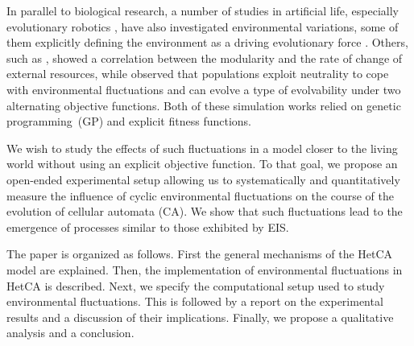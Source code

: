 In parallel to biological research, a number of studies in artificial life, especially evolutionary robotics \citep{floreano2000evolutionary}, have also investigated environmental variations, some of them explicitly defining the environment as a driving evolutionary force \citep{bredeche2012environmentdrivenopenende}.
Others, such as \citet{lipson2002origin}, showed a correlation between the modularity and the rate of change of external resources, while \citet{yu2007program} observed that populations exploit neutrality to cope with environmental fluctuations and can evolve a type of evolvability under two alternating objective functions. Both of these simulation works relied on genetic programming~(GP) and explicit fitness functions.

We wish to study the effects of such fluctuations in a model closer to the living world without using an explicit objective function. To that goal, we propose an open-ended experimental setup allowing us to systematically and quantitatively measure the influence of cyclic environmental fluctuations on the course of the evolution of cellular automata (CA). We show that such fluctuations lead to the emergence of processes similar to those exhibited by EIS.

The paper is organized as follows. First the general mechanisms of the HetCA model are explained. Then, the implementation of environmental fluctuations in HetCA is described. Next, we specify the computational setup used to study environmental fluctuations. This is followed by a report on the experimental results and a discussion of their implications. Finally, we propose a qualitative analysis and a conclusion.
